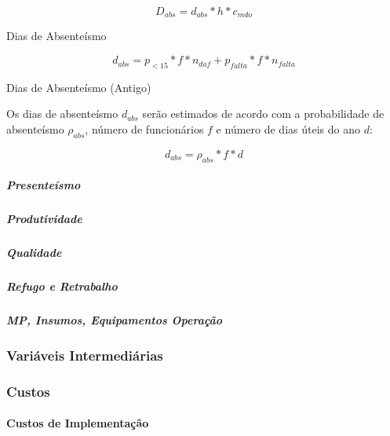 \documentclass[]{article}
\let\oldparagraph\paragraph
\renewcommand{\paragraph}[1]{\oldparagraph{#1}\mbox{}}
\let\oldsubparagraph\subparagraph
\renewcommand{\subparagraph}[1]{\oldsubparagraph{#1}\mbox{}}
\begin{document}
\[D_{abs} = d_{abs} * h * c_{mdo}\]

Dias de Absenteísmo

\[ d_{abs} = p_{<15}*f*n_{daf}+p_{falta}*f*n_{falta}\]

Dias de Absenteísmo (Antigo)

Os dias de absenteísmo \(d_{abs}\) serão estimados de acordo com a
probabilidade de absenteísmo \(\rho_{abs}\), número de funcionários
\(f\) e número de dias úteis do ano \(d\):

\[d_{abs} = \rho_{abs} * f * d\]

\subparagraph{Presenteísmo}\label{presenteismo}

\subparagraph{Produtividade}\label{produtividade}

\subparagraph{Qualidade}\label{qualidade}

\subparagraph{Refugo e Retrabalho}\label{refugo-e-retrabalho}

\subparagraph{MP, Insumos, Equipamentos
Operação}\label{mp-insumos-equipamentos-operacao}

\subsubsection{Variáveis Intermediárias}\label{variaveis-intermediarias}

\subsubsection{Custos}\label{custos}

\paragraph{Custos de Implementação}\label{custos-de-implementacao}
\end{document}
